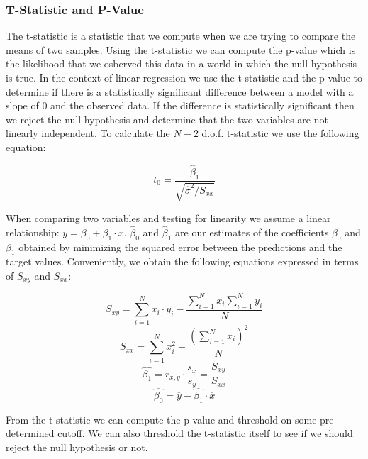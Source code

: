 \documentclass{article}
\begin{document}
\subsubsection*{T-Statistic and P-Value}
The t-statistic is a statistic that we compute when we are trying to compare the means of two samples. Using the t-statistic we can compute the p-value which is the likelihood that we osberved this data in a world in which the null hypothesis is true. In the context of linear regression we use the t-statistic and the p-value to determine if there is a statistically significant difference between a model with a slope of 0 and the observed data. If the difference is statistically significant then we reject the null hypothesis and determine that the two variables are not linearly independent. To calculate the $N-2$ d.o.f. t-statistic we use the following equation:

\[t_0 = \frac{\hat{\beta}_1}{\sqrt{\hat{\sigma}^2/S_{xx}}}\]

\noindent
When comparing two variables and testing for linearity we assume a linear relationship: $y = \beta_0 + \beta_1 \cdot x$. $\hat{\beta}_0$ and $\hat{\beta}_1$ are our estimates of the coefficients $\beta_0$ and $\beta_1$ obtained by minimizing the squared error between the predictions and the target values. Conveniently, we obtain the following equations expressed in terms of $S_{xy}$ and $S_{xx}$:

\[S_{xy} = \sum_{i=1}^{N}x_i \cdot y_i - \frac{\sum_{i=1}^{N}x_i \sum_{i=1}^{N}y_i}{N}\]
\[S_{xx} = \sum_{i=1}^{N}x_i^2 - \frac{(\sum_{i=1}^{N}x_i)^2}{N}\]
\[\hat{\beta_1} = r_{x, y} \cdot \frac{s_x}{s_y} = \frac{S_{xy}}{S_{xx}}\]
\[\hat{\beta_0} = \overline{y} - \hat{\beta_1} \cdot \overline{x}\]

\noindent
From the t-statistic we can compute the p-value and threshold on some pre-determined cutoff. We can also threshold the t-statistic itself to see if we should reject the null hypothesis or not. 
\end{document}
